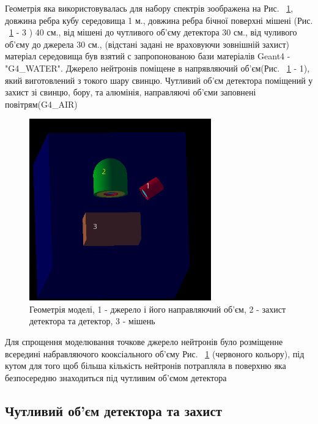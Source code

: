 \documentclass[a4paper, 14pt]{article}
\numberwithin{equation}{section}
\numberwithin{table}{section}
\begin{document}
Геометрія яка використовувалась для набору спектрів зоображена на Рис. ~\ref{ris:Geometry}, довжина ребра кубу середовища 1 м., довжина ребра бічної поверхні мішені (Рис. ~\ref{ris:Geometry} - 3 ) 40 см., від мішені до чутливого об'єму детектора 30 см., від чуливого об'єму до джерела 30 см., (відстані задані не враховуючи зовнішній захист) матеріал середовища був взятий с запропонованою бази матеріалів Geant4 - "G4\_WATER". Джерело нейтронів поміщене в напрявляючий об'єм(Рис. ~\ref{ris:Geometry} - 1), який виготовлений з токого шару свинцю. Чутливий об'єм детектора поміщений у захист зі свинцю, бору, та алюмінія, направляючі об'єми заповнені повітрям(G4\_AIR)
\begin{figure}[hbt!]
	\centering \includegraphics[width=0.7\textwidth]{images/geometryAll.png}
	\caption{Геометрія моделі, 1 - джерело і його направляючий об'єм, 2 - захист детектора та детектор, 3 - мішень} 
	\label{ris:Geometry}	
\end{figure}

Для спрощення моделювання точкове джерело нейтронів було розміщенне всередині набравляючого кооксіального об'єму Рис. ~\ref{ris:Geometry} (червоного кольору), під кутом для того щоб більша кількість нейтронів потрапляла в поверхню яка безпосередню знаходиться під чутливим об'ємом детектора 


\subsection{Чутливий об'єм детектора та захист}
	
\end{document}
